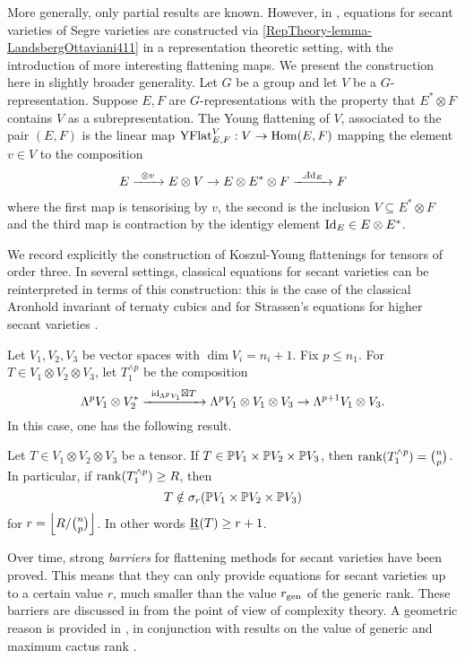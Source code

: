 More generally, only partial results are known. However, in \cite{LO13}, equations for secant varieties of Segre varieties are constructed via \ref{RepTheory-lemma-LandsbergOttaviani411} in a representation theoretic setting, with the introduction of more interesting flattening maps. We present the construction here in slightly broader generality. Let $G$ be a group and let $V$ be a $G$-representation. Suppose $E,F$ are $G$-representations with the property that $E^* \otimes F$ contains $V$ as a subrepresentation. The Young flattening of $V$, associated to the pair $(E,F)$ is the linear map $\mathrm{YFlat}^V_{E,F} : V \to \operatorname{Hom}( E,F)$ mapping the element $v \in V$ to the composition
\begin{align*}
E \xto{\otimes v} E \otimes V \to E \otimes E^* \otimes F \xto{\lrcorner \Id_E} F
\end{align*}
where the first map is tensorising by $v$, the second is the inclusion $V \subseteq E^* \otimes F$ and the third map is contraction by the identigy element $\mathrm{Id}_E \in E \otimes E^*$.

We record explicitly the construction of Koszul-Young flattenings for tensors of order three. In several settings, classical equations for secant varieties can be reinterpreted in terms of this construction: this is the case of the classical Aronhold invariant of ternaty cubics \cite[Prop. 4.4.7]{Stu93} and for Strassen's equations for higher secant varieties \cite{Str83,LO13}.

Let $V_1,V_2,V_3$ be vector spaces with $\dim V_i = n_i+1$. Fix $p \leq n_1$. For $T \in V_1 \otimes V_2 \otimes V_3$, let $T_1^{\wedge p} $ be the composition
\[
\Lambda^p V_1 \otimes V_2^*  \xto{\id_{\Lambda^p V_1} \boxtimes T} \Lambda^p V_1 \otimes V_1 \otimes V_3 \to \Lambda^{p+1} V_1 \otimes V_3.
\]
In this case, one has the following result.
\begin{proposition}
 \label{RepTheory-proposition-KoszulFlat}
 Let $T \in V_1 \otimes V_2 \otimes V_3$ be a tensor. If $T \in \mathbb{P} V_1 \times \mathbb{P} V_2 \times \mathbb{P} V_3$, then $\mathrm{rank}( T_1^{\wedge p}) = \binom{n}{p}$. In particular, if $\mathrm{rank} ( T_1^{\wedge p} ) \geq R$, then 
 \[
T \notin \sigma_r ( \mathbb{P} V_1 \times \mathbb{P} V_2 \times \mathbb{P} V_3) 
 \]
for $r = \Bigl\lfloor R / \binom{n}{p} \Bigr\rfloor$. In other words $\underline{\mathrm{R}}(T) \geq r+1$.
\end{proposition}



Over time, strong \emph{barriers} for flattening methods for secant varieties have been proved. This means that they can only provide equations for secant varieties up to a certain value $r$, much smaller than the value $r_{\mathrm{gen}}$ of the generic rank. These barriers are discussed in \cite{EGOW18} from the point of view of complexity theory. A geometric reason is provided in \cite{Gal17}, in conjunction with results on the value of generic and maximum cactus rank \cite{BR13,BBG19}. 




